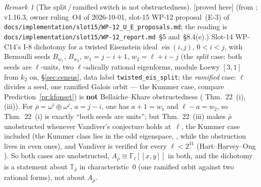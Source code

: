 \documentclass[11pt]{article}
\theoremstyle{remark}
\newtheorem{remark}[theorem]{Remark}
\newcommand{\F}{\mathbb{F}}
\newcommand{\Fl}{\F_\ell}
\newcommand{\T}{\mathbb{T}}
\newcommand{\PROVED}{\textsf{[proved here]}}
\begin{document}
\begin{remark}[The split\,/\,ramified switch is not obstructedness]\label{rmk:i8switch}
\PROVED{} (from \cite{bk}; v1.16.3, owner ruling~O4 of 2026-10-01, slot-15 WP-12 proposal~(E-3) of
\texttt{docs/implementation/slot15/WP-12\_U\_E\_proposals.md}; the reading is \texttt{docs/implementation/slot15/WP-12\_report.md}~\S5
and~\S8.4(e).)
Slot-14 WP-C14's I-8 dichotomy for a twisted Eisenstein ideal $\operatorname{eis}(i,j)$, $0<i<j$, with Bernoulli seeds $B_{w_1}$,
$B_{w_2}$, $w_1=j-i+1$, $w_2=\ell+i-j$ (the \emph{split} case: both seeds are $\ell$-units, two $\ell$-adically rational eigenforms,
module Loewy $[3,1]$ from $k_2$ on, \S\ref{sec:census}, data label \texttt{twisted\_eis\_split}; the \emph{ramified} case: $\ell$
divides a seed, one ramified Galois orbit --- the Kummer case, compare Prediction~\ref{pr:kfonset}) is \textbf{not} Bella\"iche--Khare obstructedness (\cite{bk} Thm.~22~(i), (iii)). For
$\bar\rho=\omega^i\oplus\omega^j$, $a=j-i$, one has $a+1=w_1$ and $\ell-a=w_2$, so Thm.~22~(i) is exactly ``both seeds are units''; but
Thm.~22~(iii) makes $\bar\rho$ unobstructed whenever Vandiver's conjecture holds at~$\ell$, the Kummer case included (the Kummer class lies
in the odd eigenspace, \cite{ribet}, while the obstruction lives in even ones), and Vandiver is verified for every $\ell<2^{31}$
(Hart--Harvey--Ong \cite{hho}). So both cases are unobstructed, $A_{\bar\rho}\cong\Fl[[x,y]]$ in both, and the dichotomy is a statement
about $\T_{\bar\rho}$ in characteristic~$0$ (one ramified orbit against two rational forms), not about $A_{\bar\rho}$.
\end{remark}
\end{document}
